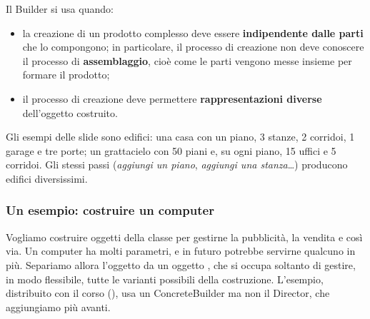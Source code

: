 Il Builder si usa quando:
\begin{itemize}
  \item la creazione di un prodotto complesso deve essere \textbf{indipendente dalle parti} che lo compongono; in
        particolare, il processo di creazione non deve conoscere il processo di \textbf{assemblaggio}, cioè come le parti
        vengono messe insieme per formare il prodotto;
  \item il processo di creazione deve permettere \textbf{rappresentazioni diverse} dell'oggetto costruito.
\end{itemize}
Gli esempi delle slide sono edifici: una casa con un piano, 3 stanze, 2 corridoi, 1 garage e tre porte; un grattacielo con
50 piani e, su ogni piano, 15 uffici e 5 corridoi. Gli stessi passi (\textit{aggiungi un piano}, \textit{aggiungi una
stanza}\ldots) producono edifici diversissimi.

\subsubsection*{Un esempio: costruire un computer}

Vogliamo costruire oggetti della classe  per gestirne la pubblicità, la vendita e così via. Un computer ha
molti parametri, e in futuro potrebbe servirne qualcuno in più. Separiamo allora l'oggetto  da un oggetto
, che si occupa soltanto di gestire, in modo flessibile, tutte le varianti possibili della costruzione.
L'esempio, distribuito con il corso (), usa un ConcreteBuilder ma non il Director, che aggiungiamo più
avanti.

